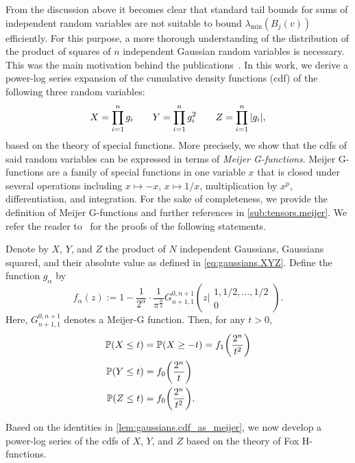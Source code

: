 From the discussion above it becomes clear that standard tail bounds for sums of independent random variables are not suitable to bound $\lambda_\mathrm{min}(B_j(v))$ efficiently.
For this purpose, a more thorough understanding of the distribution of the product of squares of $n$ independent Gaussian random variables is necessary.
This was the main motivation behind the publications~\cite{Stojanac,Stojanac}.
In this work, we derive a power-log series expansion of the cumulative density functions (cdf) of the following three random variables:
\[
  \label{eq:gaussians.XYZ}
  X = \prod_{i=1}^n g_i \quad\quad
  Y = \prod_{i=1}^n g_i^2 \quad\quad
  Z = \prod_{i=1}^n {\left\vert g_i\right\vert},
\]
based on the theory of special functions.
More precisely, we show that the cdfs of said random variables can be expressed in terms of \emph{Meijer G-functions}.
Meijer G-functions are a family of special functions in one variable $x$ that is closed under several operations including $x \mapsto -x$, $x \mapsto 1/x$, multiplication by $x^p$, differentiation, and integration.
For the sake of completeness, we provide the definition of Meijer G-functions and further references in \cref{sub:tensors.meijer}.
We refer the reader to~\cite{Stojanac} for the proofs of the following statements.

\begin{lemma}%
  \label{lem:gaussians.cdf_as_meijer}
  Denote by $X$, $Y$, and $Z$ the product of $N$ independent Gaussians, Gaussians squared, and their absolute value as defined in \cref{eq:gaussians.XYZ}.
  Define the function $g_{\alpha}$ by
  \[\label{eq:gaussians.f_alpha}
    f_{\alpha}(z)
    :=
    1 - \frac{1}{2^{\alpha}} \cdot \frac{1}{\pi^{\frac{n}{2}}}    G_{n+1, 1}^{0,n+1} \left(z \Big|  \begin{matrix} 1,1/2,\ldots,1/2 \\ 0 \end{matrix} \right).
  \]
  Here, $G_{n+1, 1}^{0,n+1}$ denotes a Meijer-G function.
  Then, for any $t> 0$,
  \begin{align}
    \mathbb{P}{\left(X \leq t\right)}&= \mathbb{P}{\left(X \geq -t\right)}  = f_{1}{\left(\frac{2^n}{t^2}\right)} \\
    \mathbb{P}{\left(Y \leq t\right)} &=  f_{0}{\left(\frac{2^n}{t}\right)} \\
    \mathbb{P}{\left(Z \leq t\right)} &= f_{0}{\left(\frac{2^n}{t^2}\right)}.
  \end{align}
\end{lemma}

Based on the identities in \cref{lem:gaussians.cdf_as_meijer}, we now develop a power-log series of the cdfs of $X$, $Y$, and $Z$ based on the theory of Fox H-functions.

